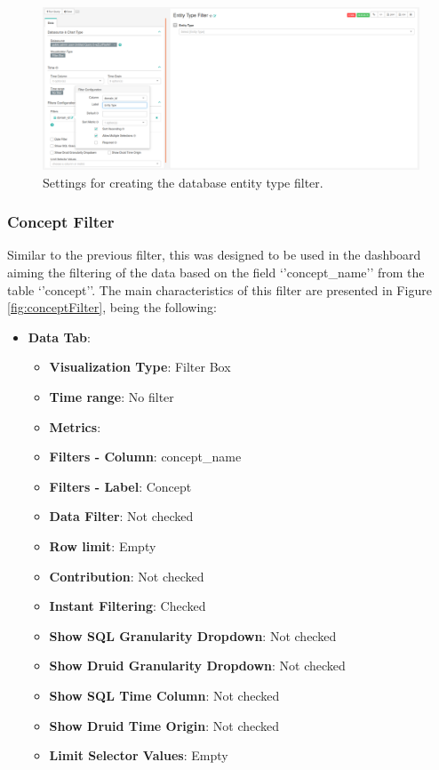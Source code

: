 \documentclass[
]{book}
\providecommand{\tightlist}{%
  \setlength{\itemsep}{0pt}\setlength{\parskip}{0pt}}
\begin{document}
\begin{figure}
\includegraphics[width=1\linewidth]{images/entityTypeFilter} \caption{Settings for creating the database entity type filter.}\label{fig:entityTypeFilter}
\end{figure}

\hypertarget{concept-filter}{%
\subsubsection{Concept Filter}\label{concept-filter}}

Similar to the previous filter, this was designed to be used in the dashboard aiming the filtering of the data based on the field `'concept\_name'' from the table `'concept''. The main characteristics of this filter are presented in Figure \ref{fig:conceptFilter}, being the following:

\begin{itemize}
\tightlist
\item
  \textbf{Data Tab}:

  \begin{itemize}
  \tightlist
  \item
    \textbf{Visualization Type}: Filter Box
  \item
    \textbf{Time range}: No filter
  \item
    \textbf{Metrics}:
  \item
    \textbf{Filters - Column}: concept\_name
  \item
    \textbf{Filters - Label}: Concept
  \item
    \textbf{Data Filter}: Not checked
  \item
    \textbf{Row limit}: Empty
  \item
    \textbf{Contribution}: Not checked
  \item
    \textbf{Instant Filtering}: Checked
  \item
    \textbf{Show SQL Granularity Dropdown}: Not checked
  \item
    \textbf{Show Druid Granularity Dropdown}: Not checked
  \item
    \textbf{Show SQL Time Column}: Not checked
  \item
    \textbf{Show Druid Time Origin}: Not checked
  \item
    \textbf{Limit Selector Values}: Empty
  \end{itemize}
\end{itemize}
\end{document}
